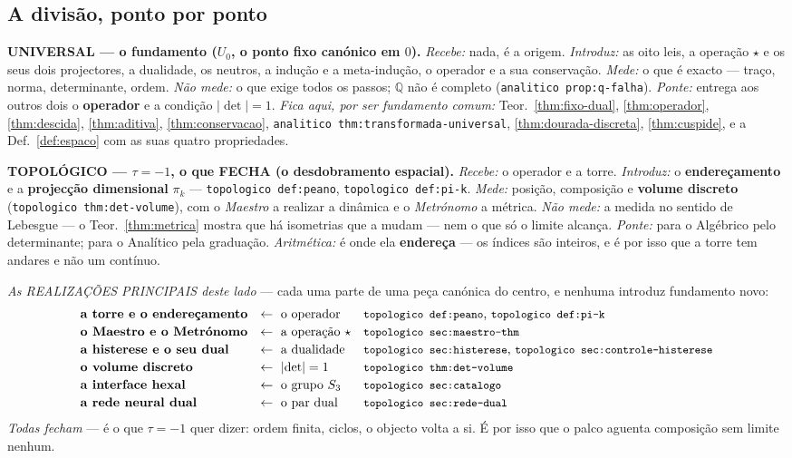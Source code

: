 \documentclass[11pt,a4paper]{article}
\newcommand{\code}[1]{\texttt{\small #1}}
\newcommand{\abs}[1]{\lvert #1\rvert}
\begin{document}
\subsection*{A divisão, ponto por ponto}

\noindent\textbf{UNIVERSAL --- o fundamento ($U_0$, o ponto fixo canónico em $0$).}
\emph{Recebe:} nada, é a origem. \emph{Introduz:} as oito leis, a operação $\star$ e os
seus dois projectores, a dualidade, os neutros, a indução e a meta-indução, o operador e a
sua conservação. \emph{Mede:} o que é exacto --- traço, norma, determinante, ordem.
\emph{Não mede:} o que exige todos os passos; $\mathbb{Q}$ não é completo
(\code{analitico prop:q-falha}). \emph{Ponte:} entrega aos outros dois o \textbf{operador} e a
condição $\abs{\det}=1$. \emph{Fica aqui, por ser fundamento comum:}
Teor.~\ref{thm:fixo-dual}, \ref{thm:operador}, \ref{thm:descida}, \ref{thm:aditiva},
\ref{thm:conservacao}, \code{analitico thm:transformada-universal}, \ref{thm:dourada-discreta},
\ref{thm:cuspide}, e a Def.~\ref{def:espaco} com as suas quatro propriedades.

\noindent\textbf{TOPOLÓGICO --- $\tau=-1$, o que FECHA (o desdobramento espacial).}
\emph{Recebe:} o operador e a torre. \emph{Introduz:} o \textbf{endereçamento} e a
\textbf{projecção dimensional} $\pi_k$ --- \code{topologico def:peano}, \code{topologico def:pi-k}. \emph{Mede:}
posição, composição e \textbf{volume discreto} (\code{topologico thm:det-volume}), com o \emph{Maestro}
a realizar a dinâmica e o \emph{Metrónomo} a métrica. \emph{Não mede:} a medida no sentido
de Lebesgue --- o Teor.~\ref{thm:metrica} mostra que há isometrias que a mudam --- nem o
que só o limite alcança. \emph{Ponte:} para o Algébrico pelo determinante; para o Analítico
pela graduação. \emph{Aritmética:} é onde ela \textbf{endereça} --- os índices são
inteiros, e é por isso que a torre tem andares e não um contínuo.

\smallskip
\noindent\emph{As REALIZAÇÕES PRINCIPAIS deste lado} --- cada uma parte de uma peça
canónica do centro, e nenhuma introduz fundamento novo:
\[
\begin{array}{lll}
\textbf{a torre e o endereçamento} & \leftarrow\ \text{o operador} &
\text{\code{topologico def:peano}, \code{topologico def:pi-k}}\\[2pt]
\textbf{o Maestro e o Metrónomo} & \leftarrow\ \text{a operação }\star &
\text{\code{topologico sec:maestro-thm}}\\[2pt]
\textbf{a histerese e o seu dual} & \leftarrow\ \text{a dualidade} &
\text{\code{topologico sec:histerese}, \code{topologico sec:controle-histerese}}\\[2pt]
\textbf{o volume discreto} & \leftarrow\ \abs{\det}=1 &
\text{\code{topologico thm:det-volume}}\\[2pt]
\textbf{a interface hexal} & \leftarrow\ \text{o grupo }S_3 &
\text{\code{topologico sec:catalogo}}\\[2pt]
\textbf{a rede neural dual} & \leftarrow\ \text{o par dual} &
\text{\code{topologico sec:rede-dual}}
\end{array}
\]
\emph{Todas fecham} --- é o que $\tau=-1$ quer dizer: ordem finita, ciclos, o objecto volta
a si. É por isso que o palco aguenta composição sem limite nenhum.
\end{document}
